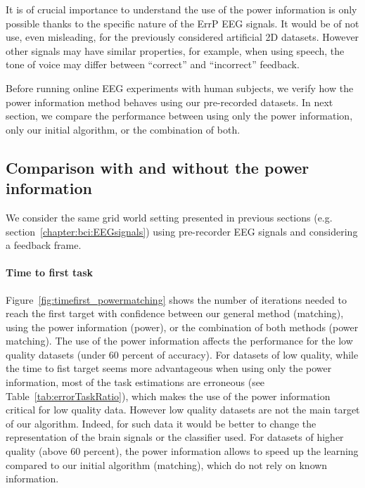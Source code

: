 

It is of crucial importance to understand the use of the power information is only possible thanks to the specific nature of the ErrP EEG signals. It would be of not use, even misleading, for the previously considered artificial 2D datasets. However other signals may have similar properties, for example, when using speech, the tone of voice may differ between ``correct'' and ``incorrect'' feedback.

Before running online EEG experiments with human subjects, we verify how the power information method behaves using our pre-recorded datasets. In next section, we compare the performance between using only the power information, only our initial algorithm, or the combination of both.

\subsection{Comparison with and without the power information}

We consider the same grid world setting presented in previous sections (e.g. section~\ref{chapter:bci:EEGsignals}) using pre-recorder EEG signals and considering a feedback frame.

\paragraph{Time to first task} Figure~\ref{fig:timefirst_powermatching} shows the number of iterations needed to reach the first target with confidence between our general method (matching), using the power information (power), or the combination of both methods (power matching). The use of the power information affects the performance for the low quality datasets (under 60 percent of accuracy). For datasets of low quality, while the time to fist target seems more advantageous when using only the power information, most of the task estimations are erroneous (see Table~\ref{tab:errorTaskRatio}), which makes the use of the power information critical for low quality data. However low quality datasets are not the main target of our algorithm. Indeed, for such data it would be better to change the representation of the brain signals or the classifier used. For datasets of higher quality (above 60 percent), the power information allows to speed up the learning compared to our initial algorithm (matching), which do not rely on known information.

